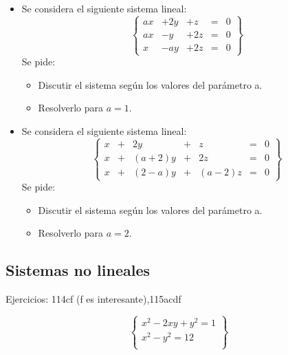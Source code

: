 \documentclass[palatino,nosec]{Docencia}
\begin{document}
\begin{itemize}
\item Se considera el siguiente sistema lineal:\[
\left\{\begin{array}{ccccc}
ax&+2y&+z&=&0\\
ax&-y&+2z&=&0\\
x&-ay&+2z&=&0
\end{array}\right\}
\]
Se pide:
\begin{itemize}
	\item Discutir el sistema según los valores del parámetro a.
	\item Resolverlo para $a=1$.
\end{itemize}

\item Se considera el siguiente sistema lineal:
\[\left\{\begin{array}{rcrcrcl}
x&+&2y&+&z&=&0\\
x&+&(a+2)y&+&2z&=&0\\
x&+&(2-a)y&+&(a-2)z&=&0
\end{array}\right\}
\]
Se pide:
\begin{itemize}
	\item Discutir el sistema según los valores del parámetro a.
	\item Resolverlo para $a=2$.
\end{itemize}

\end{itemize}

\subsection{Sistemas no lineales}

Ejercicios: 114cf (f es interesante),115acdf

\[
\left\{
	\begin{array}{c}
		x^2-2xy+y^2 = 1\\
		x^2-y^2 = 12\\
	\end{array}
\right\}
\]


\printindex
\end{document}
